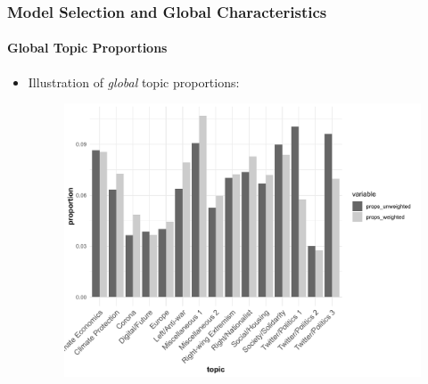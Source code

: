\documentclass[xcolor=dvipsnames]{beamer}
\begin{document}
\begin{frame}
\frametitle{Model Selection and Global Characteristics}
\framesubtitle{Global Topic Proportions}
\begin{itemize}
\item Illustration of \textit{global} topic proportions:
	\begin{figure}[h!]
  	\centering
  	\includegraphics[scale = 0.40]{../plots/4_3/global_thetas.pdf}
	\end{figure}
\end{itemize}
\end{frame}
\end{document}
